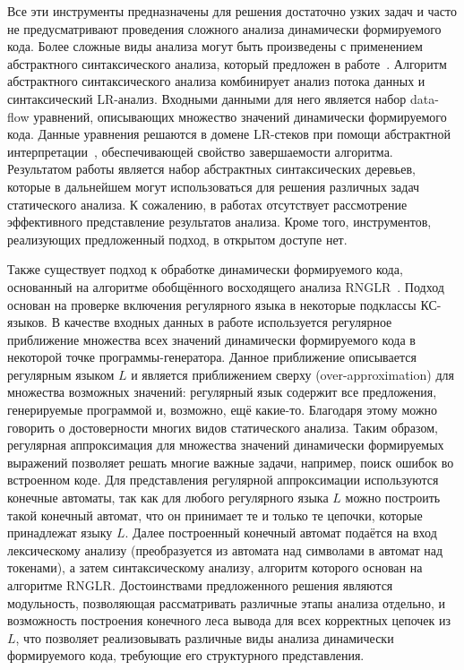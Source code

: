 Все эти инструменты предназначены для решения достаточно узких задач и часто не предусматривают проведения сложного анализа динамически формируемого кода. Более сложные виды анализа могут быть произведены с применением абстрактного синтаксического анализа, который предложен в работе~\cite{LrAbstract2}. Алгоритм абстрактного синтаксического анализа комбинирует анализ потока данных и синтаксический LR-анализ. Входными данными для него является набор data-flow уравнений, описывающих множество значений динамически формируемого кода. Данные уравнения решаются в домене LR-стеков при помощи абстрактной интерпретации~\cite{AbstractInterpretation}, обеспечивающей свойство завершаемости алгоритма. Результатом работы является набор абстрактных синтаксических деревьев, которые в дальнейшем могут использоваться для решения различных задач статического анализа. К сожалению, в работах отсутствует рассмотрение эффективного представление результатов анализа. Кроме того, инструментов, реализующих предложенный подход, в открытом доступе нет.

Также существует подход к обработке динамически формируемого кода,  основанный на алгоритме обобщённого восходящего анализа RNGLR~\cite{RelaxedARNGLR}. Подход основан на проверке включения регулярного языка в некоторые подклассы КС-языков. В качестве входных данных в работе используется регулярное приближение множества всех значений динамически формируемого кода в некоторой точке программы-генератора. Данное приближение описывается регулярным языком $L$ и является приближением сверху (over-approximation) для множества возможных значений: регулярный язык содержит все предложения, генерируемые программой и, возможно, ещё какие-то. Благодаря этому можно говорить о достоверности многих видов статического анализа. Таким образом, регулярная аппроксимация для множества значений динамически формируемых выражений позволяет решать многие важные задачи, например, поиск ошибок во встроенном коде. Для представления регулярной аппроксимации используются конечные автоматы, так как для любого регулярного языка $L$ можно построить такой конечный автомат, что он принимает те и только те цепочки, которые принадлежат языку $L$. Далее построенный конечный автомат подаётся на вход лексическому анализу (преобразуется из автомата над символами в автомат над токенами), а затем синтаксическому анализу, алгоритм которого основан на алгоритме RNGLR. Достоинствами предложенного решения являются модульность, позволяющая рассматривать различные этапы анализа отдельно, и возможность построения конечного леса вывода для всех корректных цепочек из $L$, что позволяет реализовывать различные виды анализа динамически формируемого кода, требующие его структурного представления.

